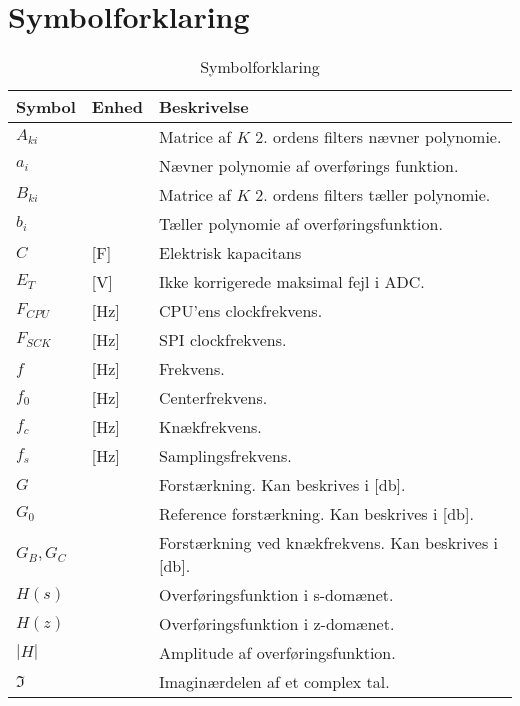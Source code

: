 \chapter{Symbolforklaring} \label{bilag:symbol}

\begin{table}[h!]
\centering
\caption{Symbolforklaring}
\label{tab:symboler}
\begin{threeparttable}
\begin{tabular}{l l l}
\toprule
\multicolumn{1}{l}{Symbol}       &
\multicolumn{1}{l}{Enhed}        &
\multicolumn{1}{l}{Beskrivelse}  \\ 
\midrule
$A_{ki}$\tnote{*}	    &   			& Matrice af $K$ 2. ordens filters nævner polynomie.\\
$a_i$\tnote{*}	    &   				& Nævner polynomie af overførings funktion.\\
$B_{ki}$\tnote{*}	    &   			& Matrice af $K$ 2. ordens filters tæller polynomie.\\
$b_i$ \tnote{*}	    &   				& Tæller polynomie af overføringsfunktion.\\
$C$ & [\si{\farad}] & Elektrisk kapacitans \\
$E_T$ & [\si{\volt}] & Ikke korrigerede maksimal fejl i ADC. \\
$F_{CPU}$ & [\si{\hertz}] & CPU'ens clockfrekvens. \\
$F_{SCK}$ & [\si{\hertz}] & SPI clockfrekvens.\\
$f$					&	[\si{\hertz}]	& Frekvens.	\\
$f_0$				&	[\si{\hertz}]	& Centerfrekvens.	\\
$f_c$				&	[\si{\hertz}]	& Knækfrekvens.	\\
$f_s$				&	[\si{\hertz}]	& Samplingsfrekvens.	\\
$G$\tnote{*}		&   				& Forstærkning. Kan beskrives i [\si{\decibel}].\\
$G_0$\tnote{*}		&   				& Reference forstærkning. Kan beskrives i [\si{\decibel}].\\
$G_B,G_C$\tnote{*}	&   				& Forstærkning ved knækfrekvens. Kan beskrives i [\si{\decibel}].\\
$H(s)$\tnote{*}	    &		            & Overføringsfunktion i s-domænet.	\\
$H(z)$\tnote{*}	    &		            & Overføringsfunktion i z-domænet.	\\
$|H|$\tnote{*}	    &		            & Amplitude af overføringsfunktion.	\\
$\Im$\tnote{*}		&					& Imaginærdelen af et complex tal.	\\

\end{tabular}
\end{threeparttable}
\end{table}
